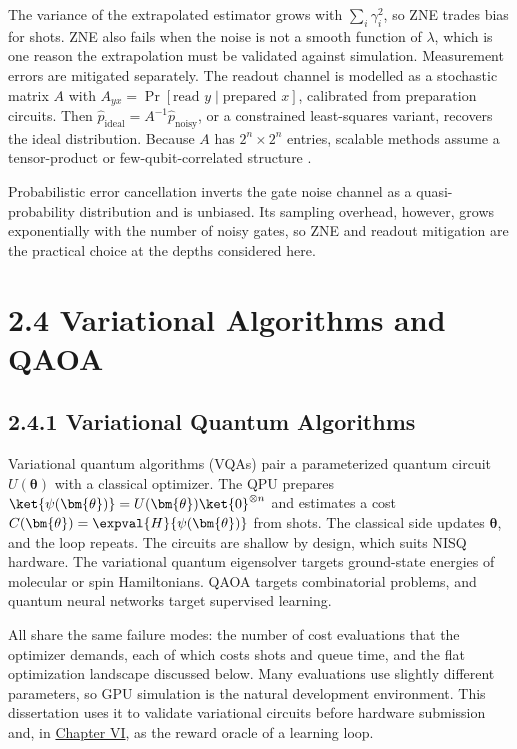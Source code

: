 \documentclass{report}
\theoremstyle{plain}
\theoremstyle{definition}
\theoremstyle{remark}
\begin{document}
The variance of the extrapolated estimator grows with $\sum_i\gamma_i^2$, so ZNE trades bias for shots. ZNE also fails when the noise is not a smooth function of $\lambda$, which is one reason the extrapolation must be validated against simulation. Measurement errors are mitigated separately. The readout channel is modelled as a stochastic matrix $A$ with $A_{yx}=\Pr[\text{read }y\mid\text{prepared }x]$, calibrated from preparation circuits. Then $\hat{p}_{\mathrm{ideal}}=A^{-1}\hat{p}_{\mathrm{noisy}}$, or a constrained least-squares variant, recovers the ideal distribution. Because $A$ has $2^n\times2^n$ entries, scalable methods assume a tensor-product or few-qubit-correlated structure \cite{bravyi2021measurement}.

Probabilistic error cancellation \cite{temme2017errormitigation} inverts the gate noise channel as a quasi-probability distribution and is unbiased. Its sampling overhead, however, grows exponentially with the number of noisy gates, so ZNE and readout mitigation are the practical choice at the depths considered here.

\section{2.4 Variational Algorithms and QAOA}\label{sec:bg:vqa}

\subsection{2.4.1 Variational Quantum Algorithms}

Variational quantum algorithms (VQAs) \cite{cerezo2021vqa} pair a parameterized quantum circuit $U(\bm{\theta})$ with a classical optimizer. The QPU prepares $\ket{\psi(\bm{\theta})}=U(\bm{\theta})\ket{0}^{\otimes n}$ and estimates a cost $C(\bm{\theta})=\expval{H}{\psi(\bm{\theta})}$ from shots. The classical side updates $\bm{\theta}$, and the loop repeats. The circuits are shallow by design, which suits NISQ hardware. The variational quantum eigensolver targets ground-state energies of molecular or spin Hamiltonians. QAOA targets combinatorial problems, and quantum neural networks target supervised learning.

All share the same failure modes: the number of cost evaluations that the optimizer demands, each of which costs shots and queue time, and the flat optimization landscape discussed below. Many evaluations use slightly different parameters, so GPU simulation is the natural development environment. This dissertation uses it to validate variational circuits before hardware submission and, in \hyperref[ch:synthesis]{Chapter VI}, as the reward oracle of a learning loop.
\end{document}
